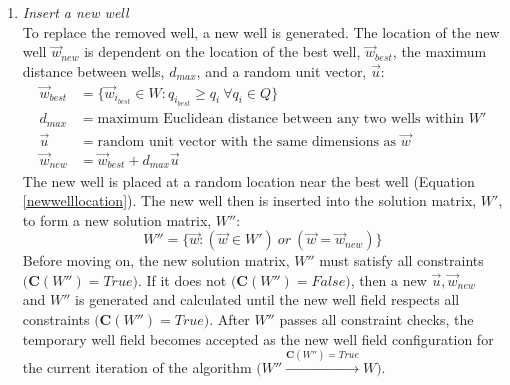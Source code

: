 \documentclass[authoryear]{elsarticle}
\begin{document}
\begin{enumerate}[Step 1:]
\item
\textit{Insert a new well}\\
To replace the removed well, a new well is generated. The location of the new well $\vec{w}_{new}$ is dependent on the location of the best well, $\vec{w}_{best}$, the maximum distance between wells, $d_{max}$, and a random unit vector, $\vec{u}$:
\begin{align}
  \vec{w}_{best}&=\{\vec{w}_{i_{best}}\in W: q_{i_{best}}\geq q_{i}\ \forall q_{i} \in Q\}\\
  d_{max} &= \text{maximum Euclidean distance between any two wells within $W'$}\\
  \vec{u} &= \text{random unit vector with the same dimensions as $\vec{w}$}\\
  \label{newwelllocation} \vec{w}_{new} &= \vec{w}_{best} + d_{max}\vec{u}
\end{align}
The new well is placed at a random location near the best well (Equation \ref{newwelllocation}). The new well then is inserted into the solution matrix, $W'$, to form a new solution matrix, $W''$:
\begin{equation}
  W'' = \{ \vec{w}:(\vec{w} \in W')\ or\ (\vec{w} = \vec{w}_{new})\}
\end{equation}
Before moving on, the new solution matrix, $W''$ must satisfy all constraints $\big(\mathbf{C}(W'') = \textit{True}\big)$. If it does not $\big(\mathbf{C}(W'') = \textit{False}\big)$, then a new $\vec{u}, \vec{w}_{new}$ and $W''$ is generated and calculated until the new well field respects all constraints $\big(\mathbf{C}(W'') = \textit{True}\big)$. After $W''$ passes all constraint checks, the temporary well field becomes accepted as the new well field configuration for the current iteration of the algorithm $\bigg( W'' \xrightarrow{\mathbf{C}(W'') = \textit{True}} W\bigg)$.


\end{enumerate}
\end{document}
